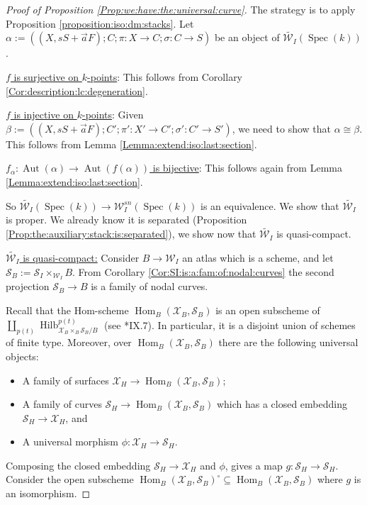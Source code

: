 \documentclass[11pt]{amsart}
\newcommand{\cE}{\mathcal{W}}
\newcommand{\sS}{\mathscr{S}}
\newcommand{\sX}{\mathscr{X}}
\newcommand{\spec}{\operatorname{Spec}}
\newcommand{\Aut}{\operatorname{Aut}}
\theoremstyle{definition}
\begin{document}
\begin{proof}[Proof of Proposition \ref{Prop:we:have:the:universal:curve}]
The strategy is to apply Proposition \ref{proposition:iso:dm:stacks}. 
Let $\alpha:=((X,sS+\vec{a}F); C; \pi:X\to C; \sigma:C \to S)$ be an object of $\widetilde{\cE_I}(\spec(k))$.

\underline{$f$ is surjective on $k$-points}: This follows from Corollary \ref{Cor:description:lc:degeneration}.


\underline{$f$ is injective on $k$-points}: Given $\beta:=((X,sS+\vec{a}F); C'; \pi':X'\to C'; \sigma':C' \to S')$,
we need to show that $\alpha \cong \beta$. This follows from
Lemma \ref{Lemma:extend:iso:last:section}.

\underline{$f_\alpha:\Aut(\alpha) \to \Aut(f(\alpha))$ is bijective}: This follows again from Lemma \ref{Lemma:extend:iso:last:section}.

So $\widetilde{\cE_I}(\spec(k)) \to \cE_I^{sn}(\spec(k))$ is an equivalence.
We show that $\widetilde{\cE_I}$ is proper.
We already know it is separated (Proposition \ref{Prop:the:auxiliary:stack:is:separated}), we show now that $\widetilde{\cE_I}$ is quasi-compact.

\underline{$\widetilde{\cE_I}$ is quasi-compact:} Consider
$B \to \cE_I$ an atlas which is a scheme, and let $\sS_B:= \sS_I \times_{\cE_I}B$. From Corollary \ref{Cor:SI:is:a:fam:of:nodal:curves} the second projection $\sS_B \to B$ is a family of nodal curves.

Recall that the Hom-scheme $\operatorname{Hom}_B(\sX_B,\sS_B)$ is an open subscheme of $\amalg _{p(t)}\operatorname{Hilb}_{\sX_B \times_B \sS_B/B}^{p(t)}$ (see \cite{arbarello-cornalba-griffiths}*{IX.7}). In particular, it is a disjoint union of schemes of finite type.
Moreover, over $\operatorname{Hom}_B(\sX_B,\sS_B)$ there are the following universal objects:\begin{itemize}
\item A family of surfaces $\sX_H \to \operatorname{Hom}_B(\sX_B,\sS_B)$;

\item A family of curves $\sS_H \to \operatorname{Hom}_B(\sX_B,\sS_B)$ which has a closed embedding $\sS_H \to \sX_H$, and
\item A universal morphism $\phi:\sX_H \to \sS_H$.
\end{itemize}
Composing the closed embedding $\sS_H\to \sX_H$ and $\phi$, gives a map $g:\sS_H \to \sS_H$.
Consider the open subscheme $\operatorname{Hom}_B(\sX_B,\sS_B)^\circ \subseteq \operatorname{Hom}_B(\sX_B,\sS_B)$ where $g$ is an isomorphism.


\end{proof}
\end{document}
